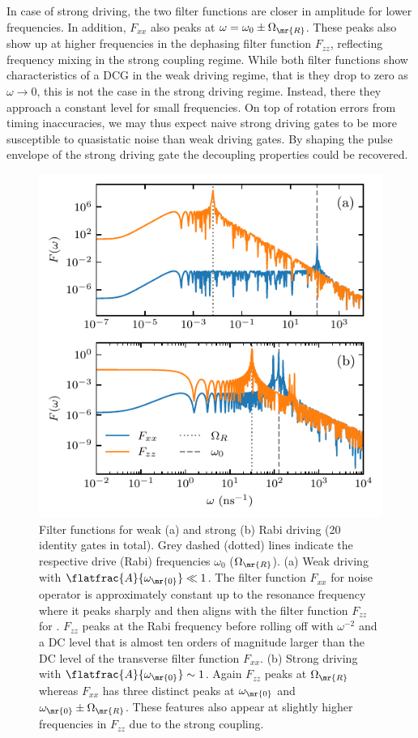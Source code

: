 In case of strong driving, the two filter functions are closer in amplitude for lower frequencies. In addition, $F_{xx}$ also peaks at $\omega = \omega_0\pm\Omega_\mr{R}$. These peaks also show up at higher frequencies in the dephasing filter function $F_{zz}$, reflecting frequency mixing in the strong coupling regime.
While both filter functions show characteristics of a DCG in the weak driving regime, that is they drop to zero as $\omega\rightarrow 0$, this is not the case in the strong driving regime. Instead, there they approach a constant level for small frequencies. On top of rotation errors from timing inaccuracies, we may thus expect naive strong driving gates to be more susceptible to quasistatic noise than weak driving gates. By shaping the pulse envelope of the strong driving gate the decoupling properties could be recovered.

\begin{figure}[tbp]
    \centering
    \includegraphics{img/rabi_driving_weak_vs_strong.pdf}
    \caption{Filter functions for weak (a) and strong (b) Rabi driving (\num{20} identity gates in total). Grey dashed (dotted) lines indicate the respective drive (Rabi) frequencies $\omega_0$ ($\Omega_\mr{R}$). (a) Weak driving with $\flatfrac{A}{\omega_\mr{0}}\ll 1$. The filter function $F_{xx}$ for noise operator \px is approximately constant up to the resonance frequency where it peaks sharply and then aligns with the filter function $F_{zz}$ for \pz. $F_{zz}$ peaks at the Rabi frequency before rolling off with $\omega^{-2}$ and a DC level that is almost ten orders of magnitude larger than the DC level of the transverse filter function $F_{xx}$. (b) Strong driving with $\flatfrac{A}{\omega_\mr{0}}\sim 1$. Again $F_{zz}$ peaks at $\Omega_\mr{R}$ whereas $F_{xx}$ has three distinct peaks at $\omega_\mr{0}$ and $\omega_\mr{0}\pm\Omega_\mr{R}$. These features also appear at slightly higher frequencies in $F_{zz}$ due to the strong coupling.}
    \label{fig:filter_function:rabi:weak_vs_strong}
\end{figure}

